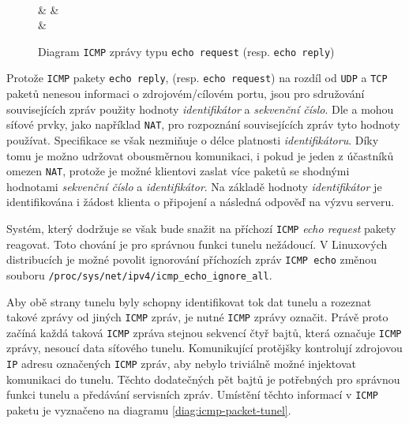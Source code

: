 \documentclass[thesis=M,czech]{FITthesis}[2012/10/20]
\begin{document}
    \begin{figure}[h]
    \centering
	\begin{bytefield}[bitwidth=1em]{32}
	    \\
	     &  & 
	    \\
	     & 
	    \\
	\end{bytefield}
	\caption{Diagram \texttt{ICMP} zprávy typu \texttt{echo request} (resp. \texttt{echo reply})}
	\label{diag:icmp-packet}
    \end{figure}
    
    Protože \texttt{ICMP} pakety \texttt{echo reply}, (resp. \texttt{echo request}) na rozdíl od \texttt{UDP} a \texttt{TCP} paketů nenesou informaci o zdrojovém/cílovém portu, jsou pro sdružování souvisejících zpráv použity hodnoty \textit{identifikátor} a \textit{sekvenční číslo}. Dle \cite[RFC 792]{rfc792} a \cite[RFC 3022]{rfc3022} mohou síťové prvky, jako například \texttt{NAT}, pro rozpoznání souvisejících zpráv tyto hodnoty používat. Specifikace se však nezmiňuje o délce platnosti \textit{identifikátoru}. Díky tomu je možno udržovat obousměrnou komunikaci, i pokud je jeden z účastníků omezen \texttt{NAT}, protože je možné klientovi  zaslat více paketů se shodnými hodnotami \textit{sekvenční číslo} a \textit{identifikátor}. Na základě hodnoty \textit{identifikátor} je identifikována i žádost klienta o připojení a následná odpověď na výzvu serveru.
    
    Systém, který dodržuje \cite[RFC1122]{rfc1122} se však bude snažit na příchozí \texttt{ICMP} \textit{echo request} pakety reagovat. Toto chování je pro správnou funkci tunelu nežádoucí. V Linuxových distribucích je možné povolit ignorování příchozích zpráv \texttt{ICMP echo} změnou souboru \texttt{/proc/sys/net/ipv4/icmp\_echo\_ignore\_all}.
    
    Aby obě strany tunelu byly schopny identifikovat tok dat tunelu a rozeznat takové zprávy od jiných \texttt{ICMP} zpráv, je nutné  \texttt{ICMP} zprávy označit. Právě proto začíná každá taková \texttt{ICMP} zpráva stejnou sekvencí čtyř bajtů, která označuje \texttt{ICMP} zprávy, nesoucí data síťového tunelu. Komunikující protějšky kontrolují zdrojovou \texttt{IP} adresu označených \texttt{ICMP} zpráv, aby nebylo triviálně možné injektovat komunikaci do tunelu. Těchto dodatečných pět bajtů je potřebných pro správnou funkci tunelu a předávání servisních zpráv. Umístění těchto informací v \texttt{ICMP} paketu je vyznačeno na diagramu \ref{diag:icmp-packet-tunel}.
    
\end{document}
